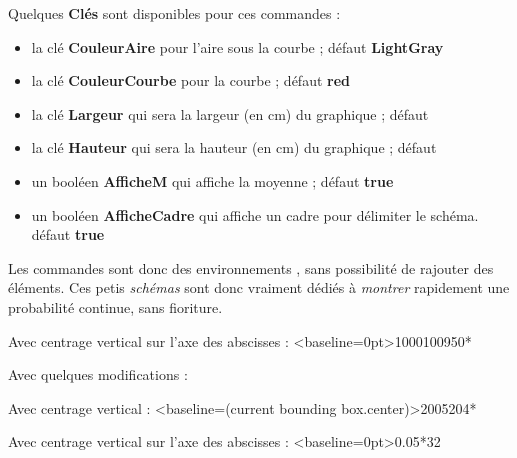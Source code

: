 \documentclass{article}
\newcommand\Cle[1]{{\bfseries\sffamily\textlangle #1\textrangle}}
\begin{document}
\begin{codecles}
Quelques \Cle{Clés} sont disponibles pour ces commandes :

\begin{itemize}
	\item la clé \Cle{CouleurAire} pour l'aire sous la courbe ; \hfill{}défaut \Cle{LightGray}
	\item la clé \Cle{CouleurCourbe} pour la courbe ; \hfill{}défaut \Cle{red}
	\item la clé \Cle{Largeur} qui sera la largeur (en cm) du graphique ; \hfill{}défaut \Cle{2}
	\item la clé \Cle{Hauteur} qui sera la hauteur (en cm) du graphique ; \hfill{}défaut \Cle{1}
	\item un booléen \Cle{AfficheM} qui affiche la moyenne ; \hfill{}défaut \Cle{true}
	\item un booléen \Cle{AfficheCadre} qui affiche un cadre pour délimiter le schéma. \hfill{}défaut \Cle{true}
\end{itemize}
\end{codecles}

\begin{codeinfo}
Les commandes sont donc des environnements \TikZ, sans possibilité de \og rajouter \fg{} des éléments. Ces petis \textit{schémas} sont donc vraiment dédiés à \textit{montrer} rapidement une probabilité continue, sans fioriture.
\end{codeinfo}

\begin{codetex}
Avec centrage vertical sur l'axe des abscisses :
\LoiNormaleGraphe[AfficheM=false,CouleurCourbe=Blue,CouleurAire=LightBlue]<baseline=0pt>{1000}{100}{950}{*}
\end{codetex}

\begin{codetex}
Avec quelques modifications :


\medskip

Avec centrage vertical :
\LoiNormaleGraphe[Largeur=5,Hauteur=2.5]<baseline=(current bounding box.center)>{200}{5}{204}{*}

\medskip

Avec centrage vertical sur l'axe des abscisses :
\LoiExpoGraphe[AfficheM=false,CouleurCourbe=Blue,CouleurAire=LightBlue]<baseline=0pt>{0.05}{*}{32}

\medskip

\end{codetex}
\end{document}
